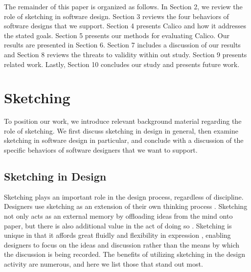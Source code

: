 The remainder of this paper is organized as follows. In Section 2, we review the role of sketching in software design. Section 3 reviews the four behaviors of software designs that we support. Section 4 presents Calico and how it addresses the stated goals. Section 5 presents our methods for evaluating Calico. Our results are presented in Section 6. Section 7 includes a discussion of our results and Section 8 reviews the threats to validity within out study. Section 9 presents related work. Lastly, Section 10 concludes our study and presents future work.

\section{Sketching}
\label{sketching}
To position our work, we introduce relevant background material regarding the role of sketching. We first discuss sketching in design in general, then examine sketching in software design in particular, and conclude with a discussion of the specific behaviors of software designers that we want to support.

\subsection{Sketching in Design}
\label{sketching:1}
Sketching plays an important role in the design process, regardless of discipline. Designers use sketching as an extension of their own thinking process \citep{petre2009insights,lawson1994design}. Sketching not only acts as an external memory \citep{Newell} by offloading ideas from the mind onto paper, but there is also additional value in the act of doing so \citep{Schutze}. Sketching is unique in that it affords great fluidly and flexibility in expression \citep{Csikszentmihalyi}, enabling designers to focus on the ideas and discussion rather than the means by which the discussion is being recorded. The benefits of utilizing sketching in the design activity are numerous, and here we list those that stand out most.

